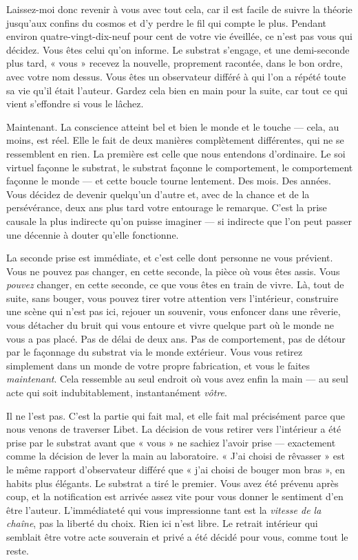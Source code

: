 \documentclass[11pt, twoside, openright]{book}
\begin{document}
Laissez-moi donc revenir à vous avec tout cela, car il est facile de suivre la théorie jusqu'aux confins du cosmos et d'y perdre le fil qui compte le plus. Pendant environ quatre-vingt-dix-neuf pour cent de votre vie éveillée, ce n'est pas vous qui décidez. Vous êtes celui qu'on informe. Le substrat s'engage, et une demi-seconde plus tard, « vous » recevez la nouvelle, proprement racontée, dans le bon ordre, avec votre nom dessus. Vous êtes un observateur différé à qui l'on a répété toute sa vie qu'il était l'auteur. Gardez cela bien en main pour la suite, car tout ce qui vient s'effondre si vous le lâchez.

Maintenant. La conscience atteint bel et bien le monde et le touche --- cela, au moins, est réel. Elle le fait de deux manières complètement différentes, qui ne se ressemblent en rien. La première est celle que nous entendons d'ordinaire. Le soi virtuel façonne le substrat, le substrat façonne le comportement, le comportement façonne le monde --- et cette boucle tourne lentement. Des mois. Des années. Vous décidez de devenir quelqu'un d'autre et, avec de la chance et de la persévérance, deux ans plus tard votre entourage le remarque. C'est la prise causale la plus indirecte qu'on puisse imaginer --- si indirecte que l'on peut passer une décennie à douter qu'elle fonctionne.

La seconde prise est immédiate, et c'est celle dont personne ne vous prévient. Vous ne pouvez pas changer, en cette seconde, la pièce où vous êtes assis. Vous \textit{pouvez} changer, en cette seconde, ce que vous êtes en train de vivre. Là, tout de suite, sans bouger, vous pouvez tirer votre attention vers l'intérieur, construire une scène qui n'est pas ici, rejouer un souvenir, vous enfoncer dans une rêverie, vous détacher du bruit qui vous entoure et vivre quelque part où le monde ne vous a pas placé. Pas de délai de deux ans. Pas de comportement, pas de détour par le façonnage du substrat via le monde extérieur. Vous vous retirez simplement dans un monde de votre propre fabrication, et vous le faites \textit{maintenant}. Cela ressemble au seul endroit où vous avez enfin la main --- au seul acte qui soit indubitablement, instantanément \textit{vôtre}.

Il ne l'est pas. C'est la partie qui fait mal, et elle fait mal précisément parce que nous venons de traverser Libet. La décision de vous retirer vers l'intérieur a été prise par le substrat avant que « vous » ne sachiez l'avoir prise --- exactement comme la décision de lever la main au laboratoire. « J'ai choisi de rêvasser » est le même rapport d'observateur différé que « j'ai choisi de bouger mon bras », en habits plus élégants. Le substrat a tiré le premier. Vous avez été prévenu après coup, et la notification est arrivée assez vite pour vous donner le sentiment d'en être l'auteur. L'immédiateté qui vous impressionne tant est la \textit{vitesse de la chaîne}, pas la liberté du choix. Rien ici n'est libre. Le retrait intérieur qui semblait être votre acte souverain et privé a été décidé pour vous, comme tout le reste.
\end{document}
